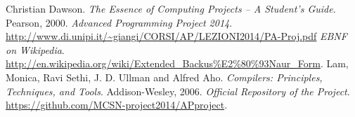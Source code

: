 \cleardoublepage  					%


\begin{thebibliography}{99}
 Christian Dawson. \emph{The Essence of Computing Projects -- A Student's Guide}. Pearson, 2000.
\emph{Advanced Programming Project 2014}. \href{http:\/\/www.di.unipi.it\/\~giangi\/CORSI\/AP\/LEZIONI2014\/PA-Proj.pdf}{\url{http://www.di.unipi.it/~giangi/CORSI/AP/LEZIONI2014/PA-Proj.pdf}}
\emph{EBNF on Wikipedia}. \href{http:\/ \/en.wikipedia.org\/wiki\/Extended\_Backus\%E2\%80\%93Naur\_Form}{\url{http://en.wikipedia.org/wiki/Extended\_Backus\%E2\%80\%93Naur\_Form}}.
Lam, Monica, Ravi Sethi, J. D. Ullman and Alfred Aho. \emph{Compilers: Principles, Techniques, and Tools}. Addison-Wesley, 2006.
\emph{Official Repository of the Project}. \href{https:\/\/github.com\/MCSN-project2014\/APproject}{\url{https://github.com/MCSN-project2014/APproject}}.

\end{thebibliography}
